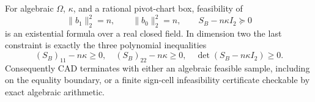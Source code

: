 For algebraic \(\Omega\), \(\kappa\), and a rational pivot-chart box, feasibility of
\[
 \lVert b_1\rVert_2^2=n,
 \qquad \lVert b_0\rVert_2^2=n,
 \qquad S_B-n\kappa I_2\succeq0
\]
is an existential formula over a real closed field.  In dimension two the last constraint is exactly the three polynomial inequalities
\[
 (S_B)_{11}-n\kappa\ge0,
 \quad (S_B)_{22}-n\kappa\ge0,
 \quad \det(S_B-n\kappa I_2)\ge0.
\]
Consequently CAD terminates with either an algebraic feasible sample, including on the equality boundary, or a finite sign-cell infeasibility certificate checkable by exact algebraic arithmetic.
